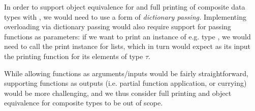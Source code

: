 In order to support object equivalence for \code{==} and full printing of
composite data types with , we would need to use a form of
\emph{dictionary passing.}
Implementing overloading via dictionary passing would also require support for
passing functions as parameters: if we want to print an instance of e.g. type
\spl{[$\tau$]}, we would need to call the print instance for lists, which in turn
would expect as its input the printing function for its elements of type $\tau$.

While allowing functions as arguments/inputs would be fairly straightforward,
supporting functions as outputs (i.e. partial function application, or currying)
would be more challenging, and we thus consider full printing and object
equivalence for composite types to be out of scope.



